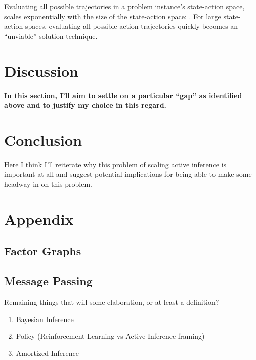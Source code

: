\documentclass[onecolumn]{IEEEtran}
\begin{document}
Evaluating all possible trajectories in a problem instance's state-action space, scales exponentially with the size of the state-action space: \textcite{Applications-of-FEP-Machine-Learning-Neuroscience}. For large state-action spaces, evaluating all possible action trajectories quickly becomes an ``unviable'' solution technique.

\section{Discussion}
\textbf{In this section, I'll aim to settle on a particular ``gap'' as identified above and to justify my choice in this regard.}

\section{Conclusion}

Here I think I'll reiterate why this problem of scaling active inference is important at all and suggest potential implications for being able to make some headway in on this problem. 

\appendix
\section{Appendix}


\subsection{Factor Graphs}

\subsection{Message Passing}



Remaining things that will some elaboration, or at least a definition?

\begin{enumerate}
	\item Bayesian Inference
	\item Policy (Reinforcement Learning vs Active Inference framing)
	\item Amortized Inference
\end{enumerate}


\printbibliography
\end{document}
